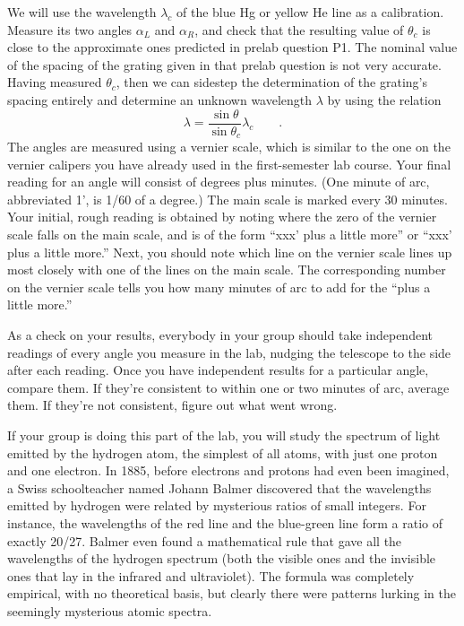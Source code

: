 We will use the wavelength $\lambda_c$ of the blue Hg or yellow He line as a calibration. Measure its two
angles $\alpha_L$ and $\alpha_R$, and check that the resulting value of $\theta_c$ is
close to the approximate ones predicted in prelab question P1. The nominal value of the
spacing of the grating given in that prelab question is not very accurate.
Having measured $\theta_c$,
then we can sidestep the determination of the grating's spacing entirely 
and determine an unknown wavelength $\lambda$
by using the relation
\begin{equation*}
  \lambda = \frac{\sin\theta}{\sin\theta_c} \lambda_c \qquad .
\end{equation*}
The angles are measured using a vernier scale, which
is similar to the one on the vernier calipers you have
already used in the first-semester lab course. Your final
reading for an angle will consist of degrees plus minutes.
(One minute of arc, abbreviated 1', is 1/60 of a degree.)
The main scale is marked every 30 minutes. Your initial,
rough reading is obtained by noting where the zero of the
vernier scale falls on the main scale, and is of the form
``xxx' plus a little more'' or ``xxx'
plus a little more.'' Next, you should note which line on
the vernier scale lines up most closely with one of the
lines on the main scale. The corresponding number on the
vernier scale tells you how many minutes of arc to add for
the ``plus a little more.''

As a check on your results,
everybody in your group should take independent readings of every
angle you measure in the lab, nudging the telescope to the side after
each reading. Once you have independent results for a particular angle,
compare them. If they're consistent to within one or two minutes of
arc, average them. If they're not consistent, figure out what went
wrong.


If your group is doing this part of the lab, you will study the spectrum of light emitted by
the hydrogen atom, the simplest of all atoms, with just one
proton and one electron. In 1885, before electrons and
protons had even been imagined, a Swiss schoolteacher named
Johann Balmer discovered that the wavelengths emitted by
hydrogen were related by mysterious ratios of small
integers. For instance, the wavelengths of the red line and
the blue-green line form a ratio of exactly 20/27. Balmer
even found a mathematical rule that gave all the wavelengths
of the hydrogen spectrum (both the visible ones and the
invisible ones that lay in the infrared and ultraviolet).
The formula was completely empirical, with no theoretical
basis, but clearly there were patterns lurking in the
seemingly mysterious atomic spectra.

